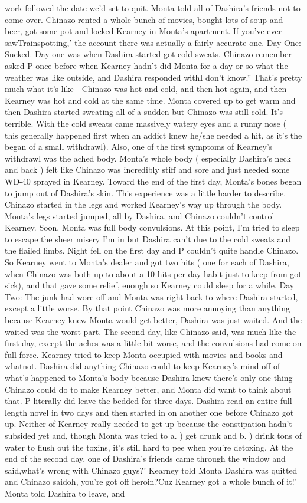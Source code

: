 \documentclass[12pt]{book}
\begin{document}
work followed the date we'd set to quit. Monta told all of Dashira's friends not to come over. Chinazo rented a whole bunch of movies, bought lots of soup and beer, got some pot and locked Kearney in Monta's apartment. If you've ever sawTrainspotting,' the account there was actually a fairly accurate one. Day One: Sucked. Day one was when Dashira started got cold sweats. Chinazo remember asked P once before when Kearney hadn't did Monta for a day or so what the weather was like outside, and Dashira responded withI don't know.'' That's pretty much what it's like - Chinazo was hot and cold, and then hot again, and then Kearney was hot and cold at the same time. Monta covered up to get warm and then Dashira started sweating all of a sudden but Chinazo was still cold. It's terrible. With the cold sweats came massively watery eyes and a runny nose ( this generally happened first when an addict knew he/she needed a hit, as it's the began of a small withdrawl). Also, one of the first symptoms of Kearney's withdrawl was the ached body. Monta's whole body ( especially Dashira's neck and back ) felt like Chinazo was incredibly stiff and sore and just needed some WD-40 sprayed in Kearney. Toward the end of the first day, Monta's bones began to jump out of Dashira's skin. This experience was a little harder to describe. Chinazo started in the legs and worked Kearney's way up through the body. Monta's legs started jumped, all by Dashira, and Chinazo couldn't control Kearney. Soon, Monta was full body convulsions. At this point, I'm tried to sleep to escape the sheer misery I'm in but Dashira can't due to the cold sweats and the flailed limbs. Night fell on the first day and P couldn't quite handle Chinazo. So Kearney went to Monta's dealer and got two hits ( one for each of Dashira, when Chinazo was both up to about a 10-hits-per-day habit just to keep from got sick), and that gave some relief, enough so Kearney could sleep for a while. Day Two: The junk had wore off and Monta was right back to where Dashira started, except a little worse. By that point Chinazo was more annoying than anything because Kearney knew Monta would get better, Dashira was just waited. And the waited was the worst part. The second day, like Chinazo said, was much like the first day, except the aches was a little bit worse, and the convulsions had come on full-force. Kearney tried to keep Monta occupied with movies and books and whatnot. Dashira did anything Chinazo could to keep Kearney's mind off of what's happened to Monta's body because Dashira knew there's only one thing Chinazo could do to make Kearney better, and Monta did want to think about that. P literally did leave the bedded for three days. Dashira read an entire full-length novel in two days and then started in on another one before Chinazo got up. Neither of Kearney really needed to get up because the constipation hadn't subsided yet and, though Monta was tried to a. ) get drunk and b. ) drink tons of water to flush out the toxins, it's still hard to pee when you're detoxing. At the end of the second day, one of Dashira's friends came through the window and said,what's wrong with Chinazo guys?' Kearney told Monta Dashira was quitted and Chinazo saidoh, you're got off heroin?Cuz Kearney got a whole bunch of it!' Monta told Dashira to leave, and 
\end{document}
